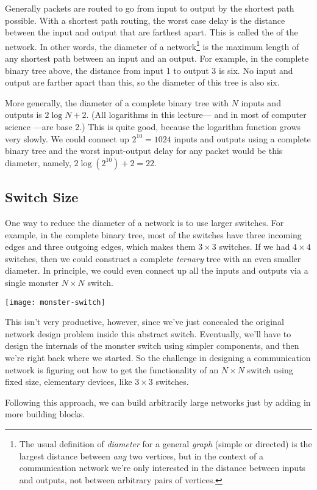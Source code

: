 Generally packets are routed to go from input to output by the shortest
path possible.  With a shortest path routing, the worst case delay is the
distance between the input and output that are farthest apart.  This is
called the  of the network.  In other words, the diameter
of a network\footnote{The usual definition of \emph{diameter} for a
general \textit{graph} (simple or directed) is the largest distance
between \emph{any} two vertices, but in the context of a communication
network we're only interested in the distance between inputs and outputs,
not between arbitrary pairs of vertices.} is the maximum length of any
shortest path between an input and an output.  For example, in the
complete binary tree above, the distance from input 1 to output 3 is six.
No input and output are farther apart than this, so the diameter of this
tree is also six.

More generally, the diameter of a complete binary tree with $N$ inputs and
outputs is $2 \log N + 2$.  (All logarithms in this lecture--- and in most
of computer science ---are base 2.)  This is quite good, because the
logarithm function grows very slowly.  We could connect up $2^{10} = 1024$
inputs and outputs using a complete binary tree and the worst input-output
delay for any packet would be this diameter, namely, $2 \log(2^{10}) + 2 =
22$.

\subsection{Switch Size}

One way to reduce the diameter of a network is to use larger switches.
For example, in the complete binary tree, most of the switches have
three incoming edges and three outgoing edges, which makes them $3
\times 3$ switches.  If we had $4 \times 4$ switches, then we could
construct a complete \textit{ternary} tree with an even smaller
diameter.  In principle, we could even connect up all the inputs and
outputs via a single monster $N \times N$ switch.

\begin{staffnotes}
\texttt{[image: monster-switch]}
\end{staffnotes}

This isn't very productive, however, since we've just concealed the
original network design problem inside this abstract switch.
Eventually, we'll have to design the internals of the monster switch
using simpler components, and then we're right back where we started.
So the challenge in designing a communication network is figuring out
how to get the functionality of an $N \times N$ switch using
fixed size, elementary devices, like $3 \times 3$ switches.
\begin{solution}
Following this approach, we can build arbitrarily large networks
just by adding in more building blocks. 
\end{solution}

